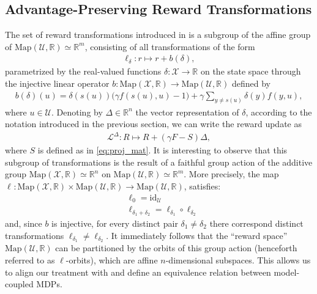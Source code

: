 \documentclass[10pt,leqno]{amsart}
\newcommand{\sml}{\scriptscriptstyle}
\newcommand{\id}[1]{\text{id}_{\sml #1}}
\newcommand{\R}{\mathbb{R}}
\newcommand{\U}{\mathcal{U}}
\newcommand{\X}{\mathcal{X}}
\newcommand{\cost}{r}
\newcommand{\Cost}{R}
\newcommand{\f}{f}
\newcommand{\F}{F}
\newcommand{\act}{u}   %
\newcommand{\disc}{\gamma}
\newcommand{\lintransf}{b}
\newcommand{\proj}{s}
\newcommand{\Proj}{S}
\newcommand{\maps}{\text{Map}}
\newcommand{\actAdvsym}{\ell}
\newcommand{\actAdv}[1]{\actAdvsym_{#1}}
\begin{document}
\subsection{Advantage-Preserving Reward Transformations}
\label{subsec:section_1A}
The set of reward transformations introduced in \cite{mustafin2025mdpgeometrynormalizationreward} is a subgroup of the affine group of $\maps(\U, \R) \simeq \R^m$, consisting of all transformations of the form
\begin{align}\label{eq:reward_transform}
    \actAdv{\delta}: \cost \mapsto \cost + \lintransf(\delta),
\end{align}
parametrized by the real-valued functions $\delta : \X \to \R$ on the state space through the injective linear operator $\lintransf : \maps(\X, \R) \to \maps(\U, \R)$ defined by 
\begin{align*}
    \lintransf(\delta)(\act) = \delta(\proj(\act))\bigl(\disc \f(\proj(\act), \act) - 1\bigr) + \disc\!\!\! \sum_{y \neq \proj(\act)}\!\! \delta(y) \f(y, \act),
\end{align*}
where $\act \in \U$. Denoting by $\Delta \in \R^n$ the vector representation of $\delta$, according to the notation introduced in the previous section, we can write the reward update as
\begin{align}\label{eq:reward_transform_representation}
    \mathcal{L}^\Delta: \Cost \mapsto \Cost + \left( \disc \F - \Proj \right) \Delta,
\end{align}
where $\Proj$ is defined as in \eqref{eq:proj_mat}. It is interesting to observe that this subgroup of transformations is the result of a faithful group action of the additive group $\maps(\X, \R) \simeq \R^n$ on $\maps(\U, \R) \simeq \R^m$. More precisely, the map $\actAdv{} : \maps(\X, \R) \times \maps(\U, \R) \to \maps(\U, \R)$, satisfies:
\begin{align*}
    &\actAdv{0} = \id{\U}\\
    &\actAdv{\delta_1 + \delta_2} = \actAdv{\delta_1} \circ \actAdv{\delta_2}
\end{align*}
and, since $\lintransf$ is injective, for every distinct pair $\delta_1 \neq \delta_2$ there correspond distinct transformations $\actAdv{\delta_1} \neq \actAdv{\delta_2}$. It immediately follows that the ``reward space'' $\maps(\U, \R)$ can be partitioned by the orbits of this group action (henceforth referred to as $\actAdvsym$-orbits), which are affine $n$-dimensional subspaces. This allows us to align our treatment with \cite{mustafin2025mdpgeometrynormalizationreward} and define an equivalence relation between model-coupled MDPs.
\end{document}
